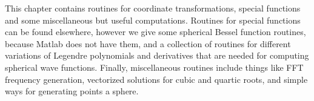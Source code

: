 


This chapter contains routines for coordinate transformations, special functions and some miscellaneous but useful computations. Routines for special functions can be found elsewhere, however we give some spherical Bessel function routines, because Matlab does not have them, and a collection of routines for different variations of Legendre polynomials and derivatives that are needed for computing spherical wave functions. Finally, miscellaneous routines include things like FFT frequency generation, vectorized solutions for cubic and quartic roots, and simple ways for generating points a sphere. 


\clearpage

\clearpage

\clearpage



